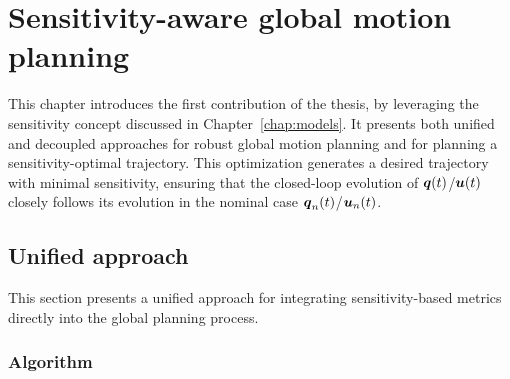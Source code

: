 \chapter{Sensitivity-aware global motion planning}

This chapter introduces the first contribution of the thesis, by leveraging the sensitivity concept discussed in Chapter~\ref{chap:models}.
It presents both unified and decoupled approaches for robust global motion planning and for planning a sensitivity-optimal trajectory. 
This optimization generates a desired trajectory with minimal sensitivity, ensuring that the closed-loop evolution of $\boldsymbol{q}(t)$/$\boldsymbol{u}(t)$ closely follows its evolution in the nominal case $\boldsymbol{q}_n(t)$/$\boldsymbol{u}_n(t)$.


\section{Unified approach}

This section presents a unified approach for integrating sensitivity-based metrics directly into the global planning process. 

\subsection{Algorithm}
